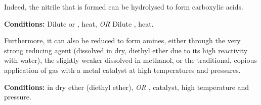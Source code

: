 


				\hypertarget{NitrileUses}{}
				Indeed, the nitrile that is formed can be hydrolysed to form carboxylic acids.

				\vspace{1.5em}
				\vbox{\textbf{Conditions:}	\tabto{35mm}Dilute  or , heat, \textit{OR}
											\tabto{35mm}Dilute , heat.}




				Furthermore, it can also be reduced to form amines, either through the very strong reducing agent 
				(dissolved in dry, diethyl ether due to its high reactivity with water), the slightly weaker  dissolved in
				methanol, or the traditional, copious application of  gas with a metal catalyst at high temperatures and pressures.

				\vspace{1.5em}
				\vbox{\textbf{Conditions:}	\tabto{35mm} in dry ether (diethyl ether), \textit{OR}
											\tabto{35mm},  catalyst, high temperature and pressure.}






